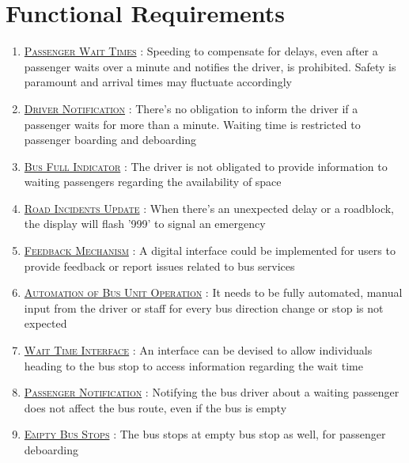 \section{Functional Requirements}

\begin{enumerate}
    \item \underline{\textsc{Passenger Wait Times}} : Speeding to compensate for delays, even after a passenger waits over a minute and notifies the driver, is prohibited. Safety is paramount and arrival times may fluctuate accordingly

    \item \underline{\textsc{Driver Notification}} : There's no obligation to inform the driver if a passenger waits for more than a minute. Waiting time is restricted to passenger boarding and deboarding

    \item \underline{\textsc{Bus Full Indicator}} : The driver is not obligated to provide information to waiting passengers regarding the availability of space

    \item \underline{\textsc{Road Incidents Update}} : When there's an unexpected delay or a roadblock, the display will flash '999' to signal an emergency

    \item {}\underline{\textsc{Feedback Mechanism}} : A digital interface could be implemented for users to provide feedback or report issues related to bus services

    \item {}\underline{\textsc{Automation of Bus Unit Operation}} :  It needs to be fully automated, manual input from the driver or staff for every bus direction change or stop is not expected

    \item \underline{\textsc{Wait Time Interface}} : An interface can be devised to allow individuals heading to the bus stop to access information regarding the wait time

    \item \underline{\textsc{Passenger Notification}} : Notifying the bus driver about a waiting passenger does not affect the bus route, even if the bus is empty

    \item \underline{\textsc{Empty Bus Stops}} : The bus stops at empty bus stop as well, for passenger deboarding


\end{enumerate}
